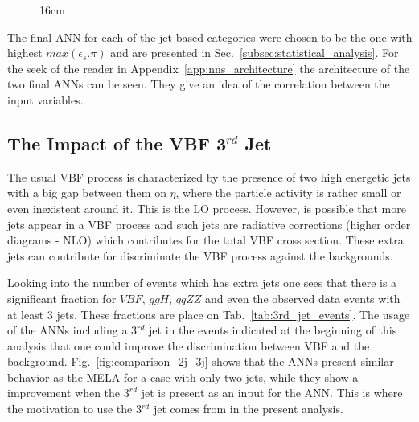 \begin{figure}[hbtp]{16cm}
	\label{fig:nn_mela_scannings}	
\end{figure}

The final ANN for each of the jet-based categories were chosen to be the one with highest $max(\epsilon_{s}.\pi)$ and are presented in Sec.~\ref{subsec:statistical_analysis}. For the seek of the reader in Appendix~\ref{app:nns_architecture} the architecture of the two final ANNs can be seen. They give an idea of the correlation between the input variables. 

\subsection{The Impact of the VBF 3$^{rd}$ Jet}
The usual VBF process is characterized by the presence of two high energetic jets with a big gap between them on $\eta$, where the particle activity is rather small or even inexistent around it. This is the LO process. However, is possible that more jets appear in a VBF process and such jets are radiative corrections (higher order diagrams - NLO) which contributes for the total VBF cross section. These extra jets can contribute for discriminate the VBF process against the backgrounds.

Looking into the number of events which has extra jets one sees that there is a significant fraction for $VBF$, $ggH$, $qqZZ$ and even the observed data events with at least 3 jets. These fractions are place on Tab.~\ref{tab:3rd_jet_events}. The usage of the ANNs including a 3$^{rd}$ jet in the events indicated at the beginning of this analysis that one could improve the discrimination between VBF and the background. Fig.~\ref{fig:comparison_2j_3j} shows that the ANNs present similar behavior as the MELA for a case with only two jets, while they show a improvement when the $3^{rd}$ jet is present as an input for the ANN. This is where the motivation to use the 3$^{rd}$ jet comes from in the present analysis.

